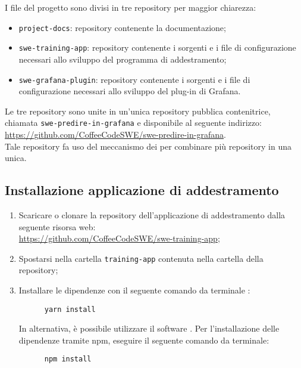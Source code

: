 \documentclass[../manuale-sviluppatore.tex]{subfiles}
\begin{document}
I file del progetto sono divisi in tre repository per maggior chiarezza:
\begin{itemize}
  \item \texttt{project-docs}: repository contenente la documentazione;
  \item \texttt{swe-training-app}: repository contenente i sorgenti e i file di configurazione necessari allo sviluppo del programma di addestramento;
  \item \texttt{swe-grafana-plugin}: repository contenente i sorgenti e i file di configurazione necessari allo sviluppo del plug-in di Grafana.
\end{itemize}
Le tre repository sono unite in un'unica repository pubblica contenitrice, chiamata \texttt{swe-predire-in-grafana} e disponibile al seguente indirizzo: \href{https://github.com/CoffeeCodeSWE/swe-predire-in-grafana}{https://github.com/CoffeeCodeSWE/swe-predire-in-grafana}. \\
Tale repository fa uso del meccanismo dei  per combinare più repository in una unica.

\subsection{Installazione applicazione di addestramento}%
\label{subs:installazione_applicazione_di_addestramento}
\begin{enumerate}
    \item Scaricare o clonare la repository dell'applicazione di addestramento dalla seguente risorsa web: \\ \href{https://github.com/CoffeeCodeSWE/swe-training-app}{https://github.com/CoffeeCodeSWE/swe-training-app};
    \item Spostarsi nella cartella \texttt{training-app} contenuta nella cartella della repository;
    \item Installare le dipendenze con il seguente comando da terminale :
    \begin{verbatim}
      yarn install
    \end{verbatim}
    In alternativa, è possibile utilizzare il software . Per l'installazione delle dipendenze tramite npm, eseguire il seguente comando da terminale:
    \begin{verbatim}
      npm install
    \end{verbatim}
\end{enumerate}
\end{document}
